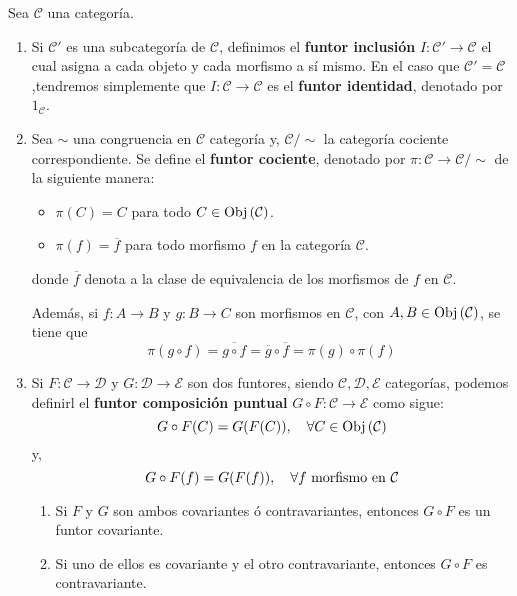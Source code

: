\documentclass[12pt]{report}
\theoremstyle{largebreak}
\newcommand\cf[3]{\ensuremath{#1:#2\rightarrow#3}}
\newcommand{\Obj}[1]{\ensuremath{\textup{Obj}\left(#1\right)}}
\begin{document}
    \begin{mydef}
        Sea $\mathcal{C}$ una categoría.
        \begin{enumerate}
            \item Si $\mathcal{C}'$ es una subcategoría de $\mathcal{C}$, definimos el \textbf{funtor inclusión} $\cf{I}{\mathcal{C}'}{\mathcal{C}}$ el cual asigna a cada objeto y cada morfismo a sí mismo. En el caso que $\mathcal{C}'=\mathcal{C}$ ,tendremos simplemente que $\cf{I}{\mathcal{C}}{\mathcal{C}}$ es el \textbf{funtor identidad}, denotado por $1_{\mathcal{C}}$.
            \item Sea $\sim$ una congruencia en $\mathcal{C}$ categoría y, $\mathcal{C}/\sim$ la categoría cociente correspondiente. Se define el \textbf{funtor cociente}, denotado por $\cf{\pi}{\mathcal{C}}{\mathcal{C}/\sim}$ de la siguiente manera:
            \begin{itemize}
                \item $\pi(C)=C$ para todo $C\in\Obj{\mathcal{C}}$.
                \item $\pi(f)=\overline{f}$ para todo morfismo $f$ en la categoría $\mathcal{C}$.
            \end{itemize}
            donde $\overline{f}$ denota a la clase de equivalencia de los morfismos de $f$ en $\mathcal{C}$.

            Además, si $\cf{f}{A}{B}$ y $\cf{g}{B}{C}$ son morfismos en $\mathcal{C}$, con $A,B\in\Obj{\mathcal{C}}$, se tiene que
            \begin{equation*}
                \pi(g\circ f)=\overline{g\circ f}=\overline{g}\circ\overline{f}=\pi(g)\circ\pi(f)
            \end{equation*}
            \item Si $\cf{F}{\mathcal{C}}{\mathcal{D}}$ y $\cf{G}{\mathcal{D}}{\mathcal{E}}$ son dos funtores, siendo $\mathcal{C},\mathcal{D},\mathcal{E}$ categorías, podemos definirl el \textbf{funtor composición puntual} $\cf{G\circ F}{\mathcal{C}}{\mathcal{E}}$ como sigue:
            \begin{equation*}
                G\circ F(C)=G(F(C)),\quad\forall C\in\Obj{\mathcal{C}}
            \end{equation*}
            y,
            \begin{equation*}
                G\circ F(f)=G(F(f)),\quad\forall f\textup{ morfismo en }\mathcal{C}
            \end{equation*}
            \begin{enumerate}
                \item Si $F$ y $G$ son ambos covariantes ó contravariantes, entonces $G\circ F$ es un funtor covariante.
                \item Si uno de ellos es covariante y el otro contravariante, entonces $G\circ F$ es contravariante. 
            \end{enumerate}
        \end{enumerate}
    \end{mydef}
\end{document}
